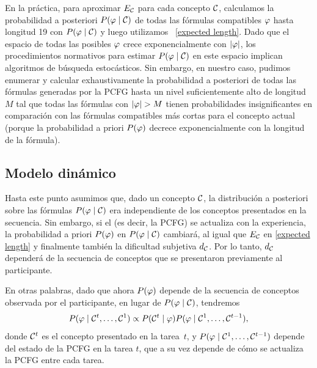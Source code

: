 En la práctica, para aproximar $E_{\mathcal{C}}$ para cada concepto $\mathcal{C}$, calculamos la probabilidad a posteriori $P(\varphi\mid \mathcal{C})$ de todas las fórmulas compatibles $\varphi$ hasta longitud 19 con $P(\varphi\mid \mathcal{C})$ y luego utilizamos ~\eqref{expected length}. Dado que el espacio de todas las posibles $\varphi$ crece exponencialmente con $|\varphi|$, los procedimientos normativos para estimar $P(\varphi\mid \mathcal{C})$ en este espacio implican algoritmos de búsqueda estocásticos. Sin embargo, en nuestro caso, pudimos enumerar y calcular exhaustivamente la probabilidad a posteriori de todas las fórmulas generadas por la PCFG hasta un nivel suficientemente alto de longitud $M$ tal que todas las fórmulas con $|\form|>M$ tienen probabilidades insignificantes en comparación con las fórmulas compatibles más cortas para el concepto actual (porque la probabilidad a priori $P(\varphi)$ decrece exponencialmente con la longitud de la fórmula).

\subsection{Modelo dinámico}


Hasta este punto asumimos que, dado un concepto $\mathcal{C}$, la distribución a posteriori sobre las fórmulas $P(\varphi\mid \mathcal{C})$ era independiente de los conceptos presentados en la secuencia. Sin embargo, si el \lot (es decir, la PCFG) se actualiza con la experiencia, la probabilidad a priori $P(\varphi)$ en $P(\varphi\mid \mathcal{C})$ cambiará, al igual que $E_{\mathcal{C}}$ en \eqref{expected length} y finalmente también la dificultad subjetiva $d_{\mathcal{C}}$. Por lo tanto, $d_{\mathcal{C}}$ dependerá de la secuencia de conceptos que se presentaron previamente al participante.

En otras palabras, dado que ahora $P(\varphi)$ depende de la secuencia de conceptos observada por el participante, en lugar de $P(\varphi\mid \mathcal{C})$, tendremos 
$$
P(\varphi\mid \mathcal{C}^{t},\dots,\mathcal{C}^{1}) \propto P(\mathcal{C}^{t}\mid \varphi)P(\varphi\mid \mathcal{C}^{1},\dots,\mathcal{C}^{t-1}),
$$ 
%
donde $\mathcal{C}^{t}$ es el concepto presentado en la tarea~$t$, y $P(\varphi\mid \mathcal{C}^{1},\dots,\mathcal{C}^{t-1})$ depende del estado de la PCFG en la tarea $t$, que a su vez depende de cómo se actualiza la PCFG entre cada tarea.

